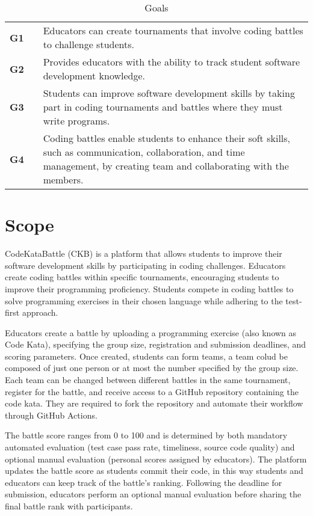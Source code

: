 \begin{table}[H]
    \centering
    \renewcommand{\arraystretch}{1.5}
    \begin{tabular}{l l p{12.5cm}}
        \hline
        \textbf{G1} &  & Educators can create tournaments that involve coding battles to challenge students.                                                                                          \\
        \textbf{G2} &  & Provides educators with the ability to track student software development knowledge.                                                                                         \\
        \textbf{G3} &  & Students can improve software development skills by taking part in coding tournaments and battles where they must write programs.                                            \\
        \textbf{G4} &  & Coding battles enable students to enhance their soft skills, such as communication, collaboration, and time management, by creating team and collaborating with the members. \\
        \hline
    \end{tabular}
    \caption{Goals}
\end{table}

\section{Scope}
CodeKataBattle (CKB) is a platform that allows students to improve their software development skills by participating in coding challenges.
Educators create coding battles within specific tournaments, encouraging students to improve their programming proficiency.
Students compete in coding battles to solve programming exercises in their chosen language while adhering to the test-first approach.

Educators create a battle by uploading a programming exercise (also known as Code Kata), specifying the group size, registration and submission deadlines, and scoring parameters.
Once created, students can form teams, a team colud be composed of just one person or at most the number specified by the group size.
Each team can be changed between different battles in the same tournament, register for the battle, and receive access to a GitHub repository containing the code kata.
They are required to fork the repository and automate their workflow through GitHub Actions.

The battle score ranges from 0 to 100 and is determined by both mandatory automated evaluation (test case pass rate, timeliness, source code quality) and optional manual evaluation (personal scores assigned by educators).
The platform updates the battle score as students commit their code, in this way students and educators can keep track of the battle's ranking.
Following the deadline for submission, educators perform an optional manual evaluation before sharing the final battle rank with participants.

